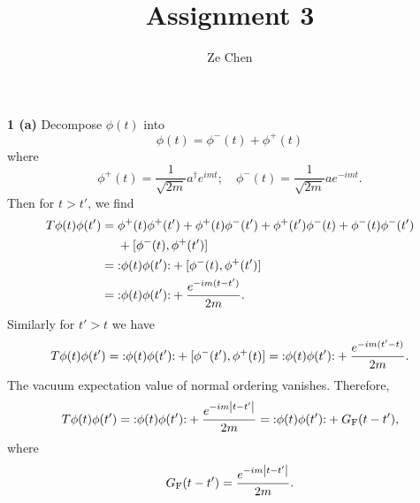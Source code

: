 \documentclass{article}
\title{Assignment 3}
\author{Ze Chen}
\makeatletter
\newcommand*{\shifttext}[1]{%
  \settowidth{\@tempdima}{#1}%
  \hspace{-\@tempdima}#1%
}
\newcommand{\plabel}[1]{%
\shifttext{\textbf{#1}\quad}%
}
\makeatother
\begin{document}
\maketitle

% 
% 

\plabel{1 (a)}%
Decompose $\phi(t)$ into
\[ \phi(t) = \phi^-(t) + \phi^+(t) \]
where
\[ \phi^+(t) = \frac{1}{\sqrt{2m}}a^\dagger e^{imt};\quad \phi^-(t) = \frac{1}{\sqrt{2m}} a e^{-imt}. \]
Then for $t>t'$, we find
\begin{align*}
    T \phi(t)\phi(t') &= \phi^+(t)\phi^+(t') + \phi^+(t)\phi^-(t') + \phi^+(t')\phi^-(t) + \phi^-(t)\phi^-(t') \\
    &\phantom{{}={}} {} + [\phi^-(t),\phi^+(t')] \\
    &= \normord{\phi(t)\phi(t')} + [\phi^-(t),\phi^+(t')] \\
    &= \normord{\phi(t)\phi(t')} + \frac{e^{-im(t-t')}}{2m}.
\end{align*}
Similarly for $t'>t$ we have
\[ T \phi(t)\phi(t') = \mathopen{:}\phi(t)\phi(t')\mathclose{:} + [\phi^-(t'),\phi^+(t)] = \mathopen{:}\phi(t)\phi(t')\mathclose{:} + \frac{e^{-im(t'-t)}}{2m}. \]
The vacuum expectation value of normal ordering vanishes.
Therefore,
\[ T\phi(t)\phi(t') = \mathopen{:}\phi(t)\phi(t')\mathclose{:} + \frac{e^{-im\abs{t-t'}}}{2m} = \mathopen{:}\phi(t)\phi(t')\mathclose{:} + G_{\mathrm{F}}(t-t'), \]
where
\[ G_{\mathrm{F}}(t-t') = \frac{e^{-im\abs{t-t'}}}{2m}. \]
\end{document}
